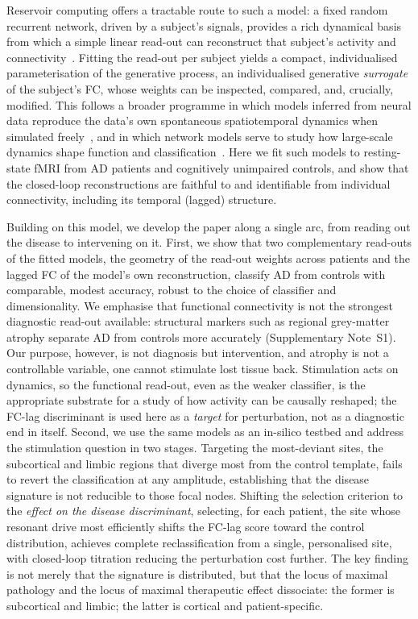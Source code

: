 \documentclass[11pt]{article}
\begin{document}
Reservoir computing offers a tractable route to such a model: a fixed random
recurrent network, driven by a subject's signals, provides a rich dynamical
basis from which a simple linear read-out can reconstruct that subject's
activity and connectivity~\cite{jaeger2001,maass2002}. Fitting the
read-out per subject yields a compact, individualised parameterisation of the
generative process, an individualised generative \emph{surrogate} of the
subject's FC, whose weights can be inspected, compared, and, crucially, modified.
This follows a broader programme in which models inferred from neural data
reproduce the data's own spontaneous spatiotemporal dynamics when simulated
freely~\cite{capone2018spont,capone2023simdata}, and in which network models
serve to study how large-scale dynamics shape function and
classification~\cite{capone2019slowosc}. Here we fit such models to
resting-state fMRI from AD patients and cognitively unimpaired controls, and
show that the closed-loop reconstructions are faithful to and identifiable from
individual connectivity, including its temporal (lagged) structure.

Building on this model, we develop the paper along a single arc, from reading
out the disease to intervening on it. First, we show that two complementary
read-outs of the fitted models, the geometry of the read-out weights across
patients and the lagged FC of the model's own reconstruction, classify AD from
controls with comparable, modest accuracy, robust to the choice of classifier
and dimensionality. We emphasise that functional connectivity is not the
strongest diagnostic read-out available: structural markers such as regional
grey-matter atrophy separate AD from controls more accurately
(Supplementary Note~S1). Our purpose, however,
is not diagnosis but intervention, and atrophy is not a controllable variable,
one cannot stimulate lost tissue back. Stimulation acts on dynamics, so the
functional read-out, even as the weaker classifier, is the appropriate substrate
for a study of how activity can be causally reshaped; the FC-lag discriminant is
used here as a \emph{target} for perturbation, not as a diagnostic end in itself.
Second, we use the same models as an in-silico testbed and
address the stimulation question in two stages. Targeting the most-deviant
sites, the subcortical and limbic regions that diverge most from the control
template, fails to revert the classification at any amplitude, establishing that
the disease signature is not reducible to those focal nodes. Shifting the
selection criterion to the \emph{effect on the disease discriminant}, selecting,
for each patient, the site whose resonant drive most efficiently shifts the FC-lag
score toward the control distribution, achieves complete reclassification from a
single, personalised site, with closed-loop titration reducing the perturbation
cost further. The key finding is not merely that the signature is distributed,
but that the locus of maximal pathology and the locus of maximal therapeutic
effect dissociate: the former is subcortical and limbic; the latter is cortical
and patient-specific.
\end{document}
